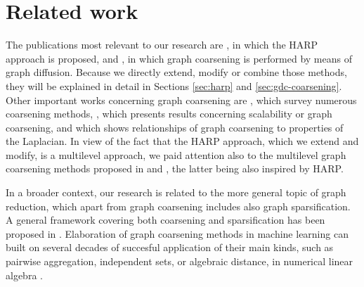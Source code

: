 \section{Related work}

The publications most relevant to our research are \cite{chen_harp_2018}, in which the HARP approach is proposed, and \cite{gasteiger_diffusion_2019}, in which graph coarsening is performed by means of graph diffusion. Because we directly extend, modify or combine those methods, they will be explained in detail in Sections \ref{sec:harp} and \ref{sec:gdc-coarsening}. Other important works concerning graph coarsening are \cite{akyildiz_understanding_2020, chen_graph_2022}, which survey numerous coarsening methods, \cite{huang_scaling_2021}, which presents results concerning scalability or graph coarsening, and \cite{loukas_graph_2019} which shows relationships of graph coarsening to properties of the Laplacian. In view of the fact that the HARP approach, which we extend and modify, is a multilevel approach, we paid attention also to the multilevel graph coarsening methods proposed in \cite{xie_graph_2020} and \cite{zhang_harp_2021}, the latter being also inspired by HARP.

In a broader context, our research is related to the more general topic of graph reduction, which apart from graph coarsening includes also graph sparsification. A general framework covering both coarsening and sparsification has been proposed in \cite{bravo_hermsdorff_unifying_2019}. Elaboration of graph coarsening methods in machine learning can built on several decades of succesful application of their main kinds, such as pairwise aggregation, independent sets, or algebraic distance, in numerical linear algebra \cite{chen_graph_2022}.
